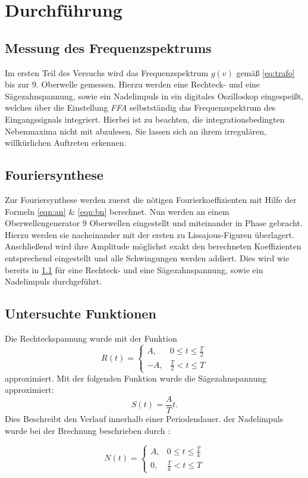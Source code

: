 \section{Durchführung}
\label{sec:Durchführung}

\subsection{Messung des Frequenzspektrums}
\label{sec:Messung}
Im ersten Teil des Versuchs wird das Frequenzspektrum $g(v)$ gemäß \eqref{eq:trafo} bis zur 9. Oberwelle gemessen.
Hierzu werden eine Rechteck- und eine Sägezahnspannung, sowie ein Nadelimpuls in ein digitales Oszilloskop eingespeißt, welches über die Einstellung \textit{FFA} selbstständig
das Frequenzspektrum des Eingangssignals integriert. Hierbei ist zu beachten, die integrationsbedingten Nebenmaxima nicht mit abzulesen. Sie lassen sich an ihrem irregulären,
willkürlichen Auftreten erkennen.


\subsection{Fouriersynthese}
\label{sec:Synthese}
Zur Fouriersynthese werden zuerst die nötigen Fourierkoeffizienten mit Hilfe der Formeln \eqref{eqn:an} \& \eqref{eqn:bn} berechnet.
Nun werden an einem Oberwellengenerator $9$ Oberwellen eingestellt und miteinander in Phase gebracht. Hierzu werden sie nacheinander mit der ersten zu Lissajous-Figuren überlagert.
Anschließend wird ihre Amplitude möglichst exakt den berechneten Koeffizienten entsprechend eingestellt und alle Schwingungen werden addiert. Dies wird wie bereits in \ref{sec:Messung}
für eine Rechteck- und eine Sägezahnspannung, sowie ein Nadelimpuls durchgeführt.
\subsection{Untersuchte Funktionen}
Die Rechteckspannung wurde mit der Funktion
\begin{equation}
  R(t)=
  \begin{cases}
    A , & 0 \leq t \leq \frac{T}{2} \\
    -A , & \frac{T}{2} < t \leq T
  \end{cases}
\label{eqn:recht}
\end{equation}
approximiert.
Mit der folgenden Funktion wurde die Sägezahnspannung approximiert:
\begin{equation}
  S(t)= \frac{A}{T} t.
  \label{eqn:säge}
\end{equation}
Dies Beschreibt den Verlauf innerhalb einer Periodendauer. der Nadelimpuls wurde bei der Brechnung beschrieben durch :

\begin{equation}
  N(t)=
  \begin{cases}
    A ,& 0 \leq t \leq \frac{T}{k} \\
    0 , & \frac{T}{k} < t \leq T
  \end{cases}
\label{eqn:nadel}
\end{equation}
